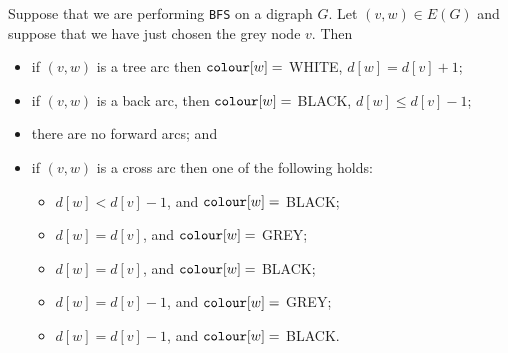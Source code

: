 \begin{Theorem} \label{thm:BFS-arcclass}
Suppose that we are performing \texttt{BFS} on a digraph $G$. Let $(v,
w)\in E(G)$ and suppose that we have just chosen the grey node $v$. 
Then
\begin{itemize}
  \item if $(v, w)$ is a tree arc then $\operatorname{\text{\texttt{colour}}}[w] = $ WHITE, $d[w] = d[v] + 1$;
  \item if $(v, w)$ is a back arc, then $\operatorname{\text{\texttt{colour}}}[w] = $ BLACK, $d[w] \leq d[v] - 1$;  
  \item there are no forward arcs; and
  \item if $(v, w)$ is a cross arc then one of the following holds:
  \begin{itemize}
	\item $d[w] < d[v] - 1$, and $\operatorname{\text{\texttt{colour}}}[w] = $ BLACK;
	\item $d[w] = d[v]$, and $\operatorname{\text{\texttt{colour}}}[w] = $ GREY;
	\item $d[w] = d[v]$, and $\operatorname{\text{\texttt{colour}}}[w] = $ BLACK;
	\item $d[w] = d[v] - 1$, and $\operatorname{\text{\texttt{colour}}}[w] = $ GREY;
	\item $d[w] = d[v] - 1$, and $\operatorname{\text{\texttt{colour}}}[w] = $ BLACK.
  \end{itemize}
\end{itemize}
\end{Theorem}
%
%

